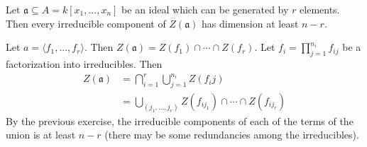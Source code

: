 \begin{questions}
\question Let $\mathfrak{a} \subseteq A = k[x_1, ..., x_n]$ be an ideal which
can be generated by $r$ elements. Then every irreducible component of $Z
(\mathfrak{a})$ has dimension at least $n - r$.
\begin{solution}
Let $a = \langle f_1, ..., f_r \rangle$. Then $Z(\mathfrak{a}) = Z(f_1) \cap
\cdots \cap Z(f_r)$. Let $f_i = \prod_{j = 1}^{n_i} f_{ij}$ be a factorization
into irreducibles. Then
\begin{align*}
Z(\mathfrak{a}) & = \bigcap_{i = 1}^r \bigcup_{j = 1}^{n_i} Z(f_ij) \\
& = \bigcup_{(j_1, ..., j_r)} Z(f_{ij_1}) \cap \cdots \cap Z(f_{ij_r})
\end{align*}
By the previous exercise, the irreducible components of each of the terms of the
union is at least $n - r$ (there may be some redundancies among the
irreducibles).
\end{solution}

\question
{}

\end{questions}





